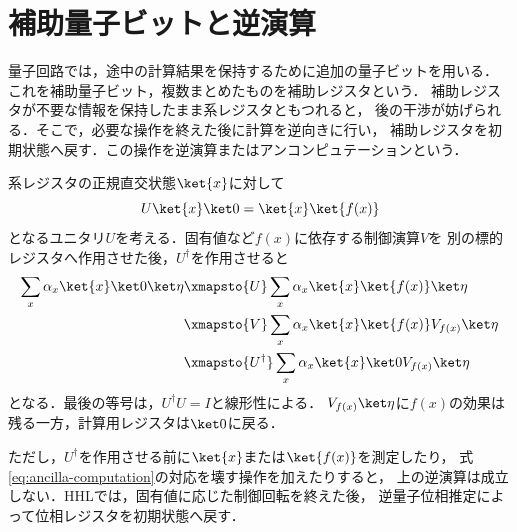 \section{補助量子ビットと逆演算}
\label{sec:ancilla-uncomputation}

量子回路では，途中の計算結果を保持するために追加の量子ビットを用いる．
これを補助量子ビット，複数まとめたものを補助レジスタという．
補助レジスタが不要な情報を保持したまま系レジスタともつれると，
後の干渉が妨げられる．そこで，必要な操作を終えた後に計算を逆向きに行い，
補助レジスタを初期状態へ戻す．この操作を逆演算またはアンコンピュテーションという．

系レジスタの正規直交状態$\ket{x}$に対して
\begin{equation}
 U\ket{x}\ket0=\ket{x}\ket{f(x)}
 \label{eq:ancilla-computation}
\end{equation}
となるユニタリ$U$を考える．固有値など$f(x)$に依存する制御演算$V$を
別の標的レジスタへ作用させた後，$U^\dagger$を作用させると
\begin{align}
 \sum_x\alpha_x\ket{x}\ket0\ket\eta
 &\xmapsto{U}
 \sum_x\alpha_x\ket{x}\ket{f(x)}\ket\eta\\
 &\xmapsto{V}
 \sum_x\alpha_x\ket{x}\ket{f(x)}V_{f(x)}\ket\eta\\
 &\xmapsto{U^\dagger}
 \sum_x\alpha_x\ket{x}\ket0V_{f(x)}\ket\eta
 \label{eq:uncomputation-superposition}
\end{align}
となる．最後の等号は，$U^\dagger U=I$と線形性による．
$V_{f(x)}\ket\eta$に$f(x)$の効果は残る一方，計算用レジスタは$\ket0$に戻る．

ただし，$U^\dagger$を作用させる前に$\ket{x}$または$\ket{f(x)}$を測定したり，
式\eqref{eq:ancilla-computation}の対応を壊す操作を加えたりすると，
上の逆演算は成立しない．HHLでは，固有値に応じた制御回転を終えた後，
逆量子位相推定によって位相レジスタを初期状態へ戻す．

